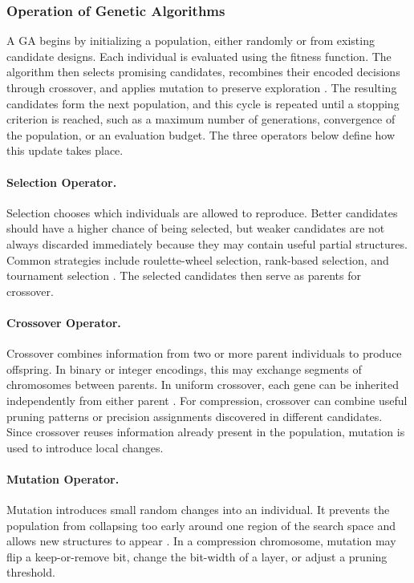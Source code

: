 \subsubsection{Operation of Genetic Algorithms}

A GA begins by initializing a population, either randomly or from existing candidate designs. Each individual is evaluated using the fitness function. The algorithm then selects promising candidates, recombines their encoded decisions through crossover, and applies mutation to preserve exploration \cite{goldberg1989genetic}. The resulting candidates form the next population, and this cycle is repeated until a stopping criterion is reached, such as a maximum number of generations, convergence of the population, or an evaluation budget. The three operators below define how this update takes place.

\paragraph{Selection Operator.}
Selection chooses which individuals are allowed to reproduce. Better candidates should have a higher chance of being selected, but weaker candidates are not always discarded immediately because they may contain useful partial structures. Common strategies include roulette-wheel selection, rank-based selection, and tournament selection \cite{baker1985adaptive,miller1995genetic}. The selected candidates then serve as parents for crossover.

\paragraph{Crossover Operator.}
Crossover combines information from two or more parent individuals to produce offspring. In binary or integer encodings, this may exchange segments of chromosomes between parents. In uniform crossover, each gene can be inherited independently from either parent \cite{syswerda1989uniform}. For compression, crossover can combine useful pruning patterns or precision assignments discovered in different candidates. Since crossover reuses information already present in the population, mutation is used to introduce local changes.

\paragraph{Mutation Operator.}
Mutation introduces small random changes into an individual. It prevents the population from collapsing too early around one region of the search space and allows new structures to appear \cite{back1993optimal}. In a compression chromosome, mutation may flip a keep-or-remove bit, change the bit-width of a layer, or adjust a pruning threshold.

